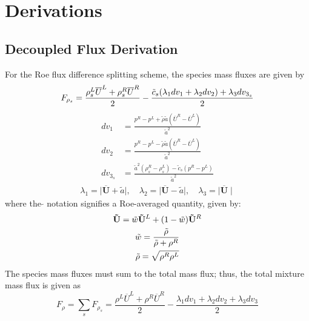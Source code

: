 \chapter{Derivations}
\label{derivations}

\section{Decoupled Flux Derivation}

For the Roe flux difference splitting scheme, the species mass fluxes are given by
\begin{equation}
	F_{\rho_s} = \frac{\rho_s^L\overline{U}^L+\rho_s^R\overline{U}^R}{2}
	-\frac{\tilde{c}_s(\lambda_1 dv_1 + \lambda_2 dv_2)+\lambda_3 dv_{3_s}}{2}
  \label{species-mass} \\
\end{equation}
\begin{align}	
		dv_1 &= \frac{p^R-p^L+\tilde{\rho} \tilde{a} (\overline{U}^R-\overline{U}^L)}{\tilde{a}^2} \\
		dv_2 &= \frac{p^R-p^L-\tilde{\rho} \tilde{a} (\overline{U}^R-\overline{U}^L)}{\tilde{a}^2} \\
		dv_{3_s} &= \frac{\tilde{a}^2 (\rho_s^R-\rho_s^L)- \tilde{c}_s (p^R-p^L)}{\tilde{a}^2}
\end{align}
\begin{align}
	\lambda_1 = \mid\mathbf{\overline{U}}+\tilde{a} \mid,\quad 
	\lambda_2 = \mid \mathbf{\overline{U}}-\tilde{a} \mid,\quad 
	\lambda_3 =  \mid \mathbf{\overline{U}} \mid
\end{align}
where the $\tilde{}$ notation signifies a Roe-averaged quantity, given by:
\begin{gather}
	\mathbf{\tilde{U}} =\tilde{w} \mathbf{\tilde{U}}^L+(1-\tilde{w})\mathbf{\tilde{U}}^R \\
	\tilde{w} = \frac{\tilde{\rho}}{\tilde{\rho}+\rho^R} \\
	\tilde{\rho} = \sqrt{\rho^R\rho^L}
\end{gather}
The species mass fluxes must sum to the total mass flux; thus, the total mixture
mass flux is given as
\begin{equation}
\label{total-mass}
	F_\rho = \sum\limits_{s}{F_{\rho_s}} = \frac{\rho^L\overline{U}^L+\rho^R\overline{U}^R}{2}
	-\frac{\lambda_1 dv_1 + \lambda_2 dv_2 +\lambda_3 dv_3}{2}
\end{equation}
